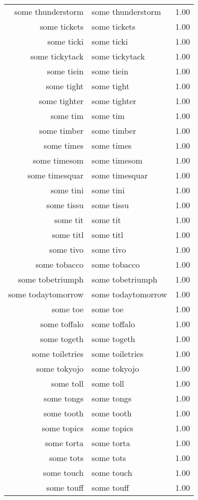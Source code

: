 \begin{table}[ht]
\begin{tabular}{rlr}
  some thunderstorm & some thunderstorm & 1.00 \\ 
  some tickets & some tickets & 1.00 \\ 
  some ticki & some ticki & 1.00 \\ 
  some tickytack & some tickytack & 1.00 \\ 
  some tiein & some tiein & 1.00 \\ 
  some tight & some tight & 1.00 \\ 
  some tighter & some tighter & 1.00 \\ 
  some tim & some tim & 1.00 \\ 
  some timber & some timber & 1.00 \\ 
  some times & some times & 1.00 \\ 
  some timesom & some timesom & 1.00 \\ 
  some timesquar & some timesquar & 1.00 \\ 
  some tini & some tini & 1.00 \\ 
  some tissu & some tissu & 1.00 \\ 
  some tit & some tit & 1.00 \\ 
  some titl & some titl & 1.00 \\ 
  some tivo & some tivo & 1.00 \\ 
  some tobacco & some tobacco & 1.00 \\ 
  some tobetriumph & some tobetriumph & 1.00 \\ 
  some todaytomorrow & some todaytomorrow & 1.00 \\ 
  some toe & some toe & 1.00 \\ 
  some toffalo & some toffalo & 1.00 \\ 
  some togeth & some togeth & 1.00 \\ 
  some toiletries & some toiletries & 1.00 \\ 
  some tokyojo & some tokyojo & 1.00 \\ 
  some toll & some toll & 1.00 \\ 
  some tongs & some tongs & 1.00 \\ 
  some tooth & some tooth & 1.00 \\ 
  some topics & some topics & 1.00 \\ 
  some torta & some torta & 1.00 \\ 
  some tots & some tots & 1.00 \\ 
  some touch & some touch & 1.00 \\ 
  some touff & some touff & 1.00 \\ 

\end{tabular}
\end{table}
